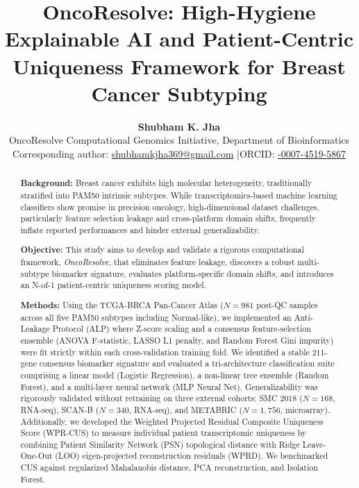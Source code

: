 \documentclass[10pt,a4paper,twocolumn]{article}
\title{\Large\sffamily\bfseries OncoResolve: High-Hygiene Explainable AI and Patient-Centric Uniqueness Framework for Breast Cancer Subtyping}
\author{\textbf{Shubham K. Jha}\\[0.3em]
\small\sffamily OncoResolve Computational Genomics Initiative, Department of Bioinformatics\\[0.2em]
\small\sffamily Corresponding author: \href{mailto:shubhamkjha369@gmail.com}{\ttfamily shubhamkjha369@gmail.com} \quad|\quad ORCID: \href{https://orcid.org/0009-0007-4519-5867}{\ttfamily 0009-0007-4519-5867}}
\date{} %
\begin{document}
\maketitle

\begin{abstract}
\noindent\textbf{Background:} Breast cancer exhibits high molecular heterogeneity, traditionally stratified into PAM50 intrinsic subtypes. While transcriptomics-based machine learning classifiers show promise in precision oncology, high-dimensional dataset challenges, particularly feature selection leakage and cross-platform domain shifts, frequently inflate reported performances and hinder external generalizability.

\vspace{0.5em}
\noindent\textbf{Objective:} This study aims to develop and validate a rigorous computational framework, \textit{OncoResolve}, that eliminates feature leakage, discovers a robust multi-subtype biomarker signature, evaluates platform-specific domain shifts, and introduces an N-of-1 patient-centric uniqueness scoring model.

\vspace{0.5em}
\noindent\textbf{Methods:} Using the TCGA-BRCA Pan-Cancer Atlas ($N=981$ post-QC samples across all five PAM50 subtypes including Normal-like), we implemented an Anti-Leakage Protocol (ALP) where Z-score scaling and a consensus feature-selection ensemble (ANOVA F-statistic, LASSO L1 penalty, and Random Forest Gini impurity) were fit strictly within each cross-validation training fold. We identified a stable 211-gene consensus biomarker signature and evaluated a tri-architecture classification suite comprising a linear model (Logistic Regression), a non-linear tree ensemble (Random Forest), and a multi-layer neural network (MLP Neural Net). Generalizability was rigorously validated without retraining on three external cohorts: SMC 2018 ($N=168$, RNA-seq), SCAN-B ($N=340$, RNA-seq), and METABRIC ($N=1,756$, microarray). Additionally, we developed the Weighted Projected Residual Composite Uniqueness Score (WPR-CUS) to measure individual patient transcriptomic uniqueness by combining Patient Similarity Network (PSN) topological distance with Ridge Leave-One-Out (LOO) eigen-projected reconstruction residuals (WPRD). We benchmarked CUS against regularized Mahalanobis distance, PCA reconstruction, and Isolation Forest.


\end{abstract}
\end{document}

